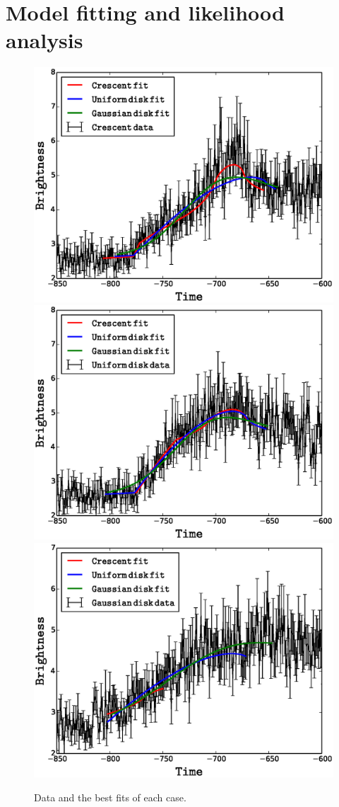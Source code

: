 \section{Model fitting and likelihood analysis}

\begin{figure}
\centering
\includegraphics[width=0.48\hsize]{data/data_cc.eps}
\includegraphics[width=0.48\hsize]{data/data_dd.eps}
\includegraphics[width=0.48\hsize]{data/data_gg.eps}
\caption{\label{fig:datafitting} Data and the best fits of each case.}
\end{figure}


